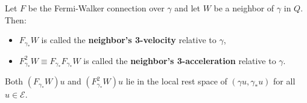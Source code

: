 Let $F$ be the Fermi-Walker connection over $\gamma$ and let $W$ be a neighbor of $\gamma$ in $Q$. Then:
\begin{itemize}
  \item $F_{\gamma_*}W$ is called the \textbf{neighbor's 3-velocity} relative to $\gamma$,
  \item $F_{\gamma_*}^2 W \equiv F_{\gamma_*} F_{\gamma_*} W$ is called the \textbf{neighbor's 3-acceleration} relative to $\gamma$.
\end{itemize}
Both $(F_{\gamma_*}W)u$ and $(F_{\gamma_*}^2 W)u$ lie in the local rest space of $(\gamma u, \gamma_* u)$ for all $u \in \mathcal{E}$.
